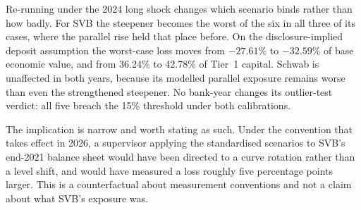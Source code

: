 Re-running under the 2024 long shock changes which scenario binds rather than how
badly. For SVB the steepener becomes the worst of the six in all three of its cases,
where the parallel rise held that place before. On the disclosure-implied deposit
assumption the worst-case loss moves from $-27.61\%$ to $-32.59\%$ of base economic
value, and from 36.24\% to 42.78\% of Tier~1 capital. Schwab is unaffected in both
years, because its modelled parallel exposure remains worse than even the strengthened
steepener. No bank-year changes its outlier-test verdict: all five breach the 15\%
threshold under both calibrations.

The implication is narrow and worth stating as such. Under the convention that takes
effect in 2026, a supervisor applying the standardised scenarios to SVB's end-2021
balance sheet would have been directed to a curve rotation rather than a level shift,
and would have measured a loss roughly five percentage points larger. This is a
counterfactual about measurement conventions and not a claim about what SVB's exposure
was.
